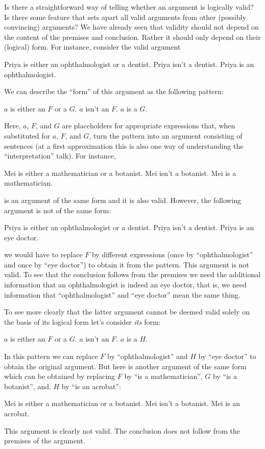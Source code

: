 Is there a straightforward way of telling whether an argument is logically valid? Is there some feature that sets apart all valid arguments from other (possibly convincing) arguments? We have already seen that validity should not depend on the content of the premises and conclusion. Rather it should only depend on their (logical) form. For instance, consider the valid argument
\begin{earg}
	\prem Priya is either an ophthalmologist or a dentist.
	\prem Priya isn't a dentist.
	\conc Priya is an ophthalmologist.
\end{earg}
We can describe the ``form'' of this argument as the following pattern:
\begin{earg}
	\prem $a$ is either an $F$ or a $G$.
	\prem $a$ isn't an $F$.
	\conc $a$ is a $G$.
\end{earg}
Here, $a$, $F$, and $G$ are placeholders for appropriate expressions that, when substituted for $a$, $F$, and $G$, turn the pattern into an argument consisting of sentences (at a first approximation this is also one way of understanding the ``interpretation'' talk). For instance,
\begin{earg}
	\prem Mei is either a mathematician or a botanist.
	\prem Mei isn't a botanist.
	\conc Mei is a mathematician.
\end{earg}
is an argument of the same form and it is also valid. However, the following argument is not of the same form:
\begin{earg}
	\prem Priya is either an ophthalmologist or a dentist.
	\prem Priya isn't a dentist.
	\conc Priya is an eye doctor.
\end{earg}
we would have to replace $F$ by different expressions (once by ``ophthalmologist'' and once by ``eye doctor'') to obtain it from the pattern. This argument is not valid. To see that the conclusion follows from the premises we need the additional information that an ophthalmologist is indeed an eye doctor, that is, we need information that ``ophthalmologist'' and ``eye doctor'' mean the same thing.

To see more clearly that the latter argument cannot be deemed valid solely on the basis of its logical form let's consider \emph{its} form:
\begin{earg}
	\prem $a$ is either an $F$ or a $G$.
	\prem $a$ isn't an $F$.
	\conc $a$ is a $H$.
\end{earg}
In this pattern we can replace $F$ by ``ophthalmologist'' and $H$ by ``eye doctor'' to obtain the original argument.  But here is another argument of the same form which can be obtained by replacing $F$ by ``is a mathematician'', $G$ by ``is a botanist'', and. $H$ by ``is an acrobat'':
\begin{earg}
	\prem Mei is either a mathematician or a botanist.
	\prem Mei isn't a botanist.
	\conc Mei is an acrobat.
\end{earg}
This argument is clearly not valid. The conclusion does not follow from the premises of the argument.

